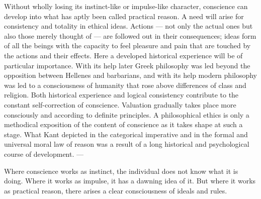 \documentclass[12pt,a4paper,openany]{book}
\newcommand{\opage}[1]{\marginnote{\footnotesize\textit{[#1]}}}
\begin{document}
\opage{87}Without wholly losing its instinct-like or impulse-like character, conscience can develop into what
has aptly been called practical reason. A need will arise for consistency and totality in ethical ideas.
Actions --- not only the actual ones but also those merely thought of --- are followed out in their
consequences; ideas form of all the beings with the capacity to feel pleasure and pain that are touched
by the actions and their effects. Here a developed historical experience will be of particular
importance. With its help later Greek philosophy was led beyond the opposition between Hellenes and
barbarians, and with its help modern philosophy was led to a consciousness of humanity that rose above
differences of class and religion. Both historical experience and logical consistency contribute to the
constant self-correction of conscience. Valuation gradually takes place more consciously and according to
definite principles. A philosophical ethics is only a methodical exposition of the content of conscience
as it takes shape at such a stage. What Kant depicted in the categorical imperative and in the formal and
universal moral law of reason was a result of a long historical and psychological course of development.
---

Where conscience works as instinct, the individual does not know what it is doing. Where it works as
impulse, it has a dawning idea of it. But where it works as practical reason, there arises a clear
consciousness of ideals and rules.
\end{document}
